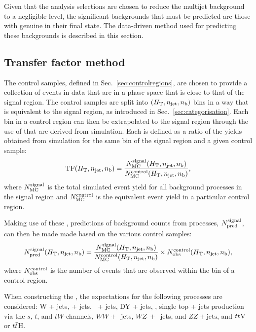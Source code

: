 Given that the analysis selections are chosen to reduce the \QCD
multijet background to a negligible level, the significant \SM
backgrounds that must be predicted are those with genuine \MET in
their final state. The data-driven method used for predicting these
backgrounds is described in this section.

\subsection{Transfer factor method}
\label{sec:TF}

The control samples, defined in Sec.~\ref{sec:controlregions}, are
chosen to provide a collection of events in data that are in a phase
space that is close to that of the signal region. The control samples
are split into $(\mbox{$H_\text{T}$},n_{\mathrm{jet}},n_{\text{b}})$ bins in a way that is equivalent to the
signal region, as introduced in Sec.~\ref{sec:categorisation}. Each
bin in a control region can then be extrapolated to the signal region
through the use of \emph{\TFs} that are derived from
simulation.  Each \TF is defined as a ratio of the yields
obtained from \MC simulation for the same bin of the signal region and
a given control sample:
\begin{equation}
  \label{equ:tf-ratio}
  {\rm TF}(\mbox{$H_\text{T}$},n_{\mathrm{jet}},n_{\text{b}}) = \frac{N_{\rm MC}^{\rm signal}(\mbox{$H_\text{T}$},n_{\mathrm{jet}},n_{\text{b}})}{N_{\rm
      MC}^{\rm control}(\mbox{$H_\text{T}$},n_{\mathrm{jet}},n_{\text{b}})}, 
\end{equation}
where $N_{\rm MC}^{\rm signal}$ is the total simulated event yield for
all background processes in the signal region and $N_{\rm MC}^{\rm
control}$ is the equivalent event yield in a particular control
region.

Making use of these \TFs, predictions of background counts from \SM
processes, $N_{\textrm{pred}}^{\rm signal}$, can then be made made based on the
various control samples:
\begin{equation}
  \label{equ:pred-method}
  N_{\textrm{pred}}^{\rm signal}(\mbox{$H_\text{T}$},n_{\mathrm{jet}},n_{\text{b}}) = \frac{N_{\rm MC}^{\rm
      signal}(\mbox{$H_\text{T}$},n_{\mathrm{jet}},n_{\text{b}})}{N_{\rm MC}^{\rm
      control}(\mbox{$H_\text{T}$},n_{\mathrm{jet}},n_{\text{b}})} \times N_{\textrm{obs}}^{\rm
    control}(\mbox{$H_\text{T}$},n_{\mathrm{jet}},n_{\text{b}}),
\end{equation}
where $N_{\textrm{obs}}^{\rm control}$ is the number of events that are observed
within the bin of a control region.

When constructing the \TFs, the \MC expectations for the following \SM
processes are considered: W + jets, \ttbar + jets, \znunu\ + jets, DY
+ jets, \gj, single top + jets production via the $s$, $t$, and
$tW$-channels, $WW+$~jets, $WZ~+$~jets, and $ZZ + \textrm{jets}$, and
$t\bar{t}$V or $t\bar{t}$H. 

